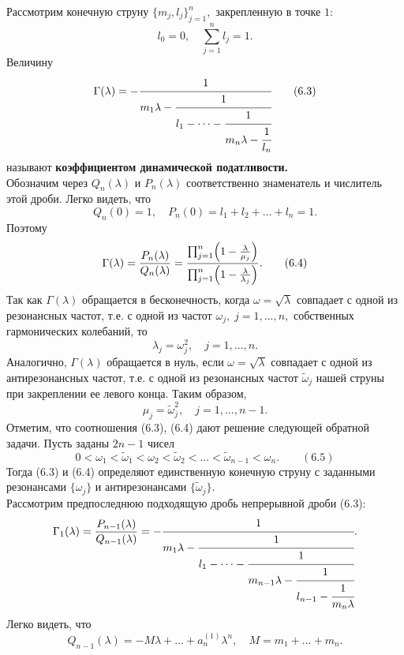 \documentclass[12 pt, a4 paper]{article}
\theoremstyle{plain}   \newtheorem{Pro}{Задача}
\begin{document}
Рассмотрим конечную струну
$ \{ m_j ,l_j \} _{j=1}^n , $
закрепленную в точке $ 1: $
$$
  l_0 =0 , \quad
    \sum _{j=1}^n l_j =1.
$$
Величину
\begin{equation*}
  \Gamma (\lambda )=-
    \cfrac{1}{m_1 \lambda -
	  \cfrac{1}{l_1 -\dotsb -
	    \cfrac{1}{m_n \lambda -
		  \cfrac{1}{l_n
	}}}}
	\qquad (6.3)
\end{equation*}
называют
{\bfseries коэффициентом динамической податливости.} \\
Обозначим через
$ Q_n (\lambda ) $
и
$ P_n (\lambda ) $
соответственно знаменатель и числитель этой дроби.
Легко видеть, что
$$
  Q_n (0)=1,
    \quad P_n (0)=l_1 +l_2 +...+l_n =1.
$$
Поэтому
\begin{equation*}
  \Gamma (\lambda )=
    \frac{P_n (\lambda )}{Q_n (\lambda )}=
	  \frac{\prod _{j=1}^n \Bigl ( 1-
	    \frac{\lambda}{\mu _j} \Bigr ) }
	  {\prod _{j=1}^n \Bigl ( 1-
	    \frac{\lambda}{\lambda _j} \Bigr ) }.
   \qquad (6.4)
\end{equation*}
Так как
$ \Gamma (\lambda ) $
обращается в бесконечность, когда
$ \omega = \sqrt{\lambda} $
совпадает с одной из резонансных частот, т.е.
с одной из частот
$ \omega _j , \; j=1,...,n, $
собственных гармонических колебаний, то
$$
  \lambda _j =\omega _j ^2 , \quad j=1,...,n.
$$
Аналогично,
$ \Gamma (\lambda ) $
обращается в нуль, если
$ \omega =\sqrt{\lambda} $
совпадает с одной из антирезонансных частот,
т.е. с одной из резонансных частот
$ \tilde \omega _j $
нашей струны при закреплении ее левого конца.
Таким образом,
$$
  \mu _j =\tilde \omega _j ^2 ,
    \quad j=1,...,n-1.
$$
Отметим, что соотношения (6.3), (6.4) дают решение следующей
обратной задачи.
Пусть заданы
$ 2n-1 $
чисел
$$
  0<\omega _1 <\tilde \omega _1 < \omega _2 <
    \tilde \omega _2 <...<\tilde \omega _{n-1}<\omega _n .
	  \qquad (6.5)
$$
Тогда (6.3) и (6.4) определяют единственную конечную струну
с заданными резонансами
$ \{ \omega _j \} $
и антирезонансами
$ \{ \tilde \omega _j \} . $ \\
Рассмотрим предпоследнюю подходящую дробь непрерывной
дроби (6.3):
\begin{equation*}
  \Gamma _1 (\lambda )=
    \frac{P_{n-1}(\lambda )}{Q_{n-1}(\lambda )}=-
	  \cfrac{1}{m_1 \lambda -
	    \cfrac{1}{l_1 - \dotsb -
		  \cfrac{1}{m_{n-1}\lambda -
		    \cfrac{1}{l_{n-1}-
			  \cfrac{1}{m_n \lambda
	  }}}}}.
\end{equation*}
Легко видеть, что
$$
  Q_{n-1}(\lambda )=-M\lambda +...+a_n ^{(1)} \lambda ^n ,
    \quad M=m_1 +...+m_n .
$$
\end{document}
